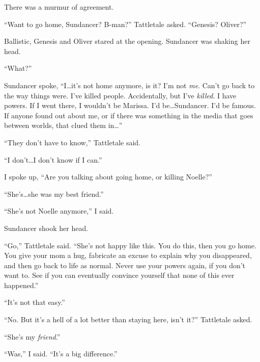 There was a murmur of agreement.



``Want to go home, Sundancer?  B-man?'' Tattletale asked.  ``Genesis?  Oliver?''



Ballistic, Genesis and Oliver stared at the opening.  Sundancer was shaking her head.



``What?''



Sundancer spoke, ``I\ldots it's not home anymore, is it?  I'm not \emph{me}.  Can't go back to the way things were.  I've killed people.  Accidentally, but I've \emph{killed}.  I have powers.  If I went there, I wouldn't be Marissa.  I'd be\ldots Sundancer.  I'd be famous.  If anyone found out about me, or if there was something in the media that goes between worlds, that clued them in\ldots''



``They don't have to know,'' Tattletale said.



``I don't\ldots I don't know if I can.''



I spoke up, ``Are you talking about going home, or killing Noelle?''



``She's\ldots she was my best friend.''



``She's not Noelle anymore,'' I said.



Sundancer shook her head.



``Go,'' Tattletale said.  ``She's not happy like this.  You do this, then you go home.  You give your mom a hug, fabricate an excuse to explain why you disappeared, and then go back to life as normal.  Never use your powers again, if you don't want to.  See if you can eventually convince yourself that none of this ever happened.''



``It's not that easy.''



``No.  But it's a hell of a lot better than staying here, isn't it?''  Tattletale asked.



``She's my \emph{friend}.''



``Was,'' I said.  ``It's a big difference.''



